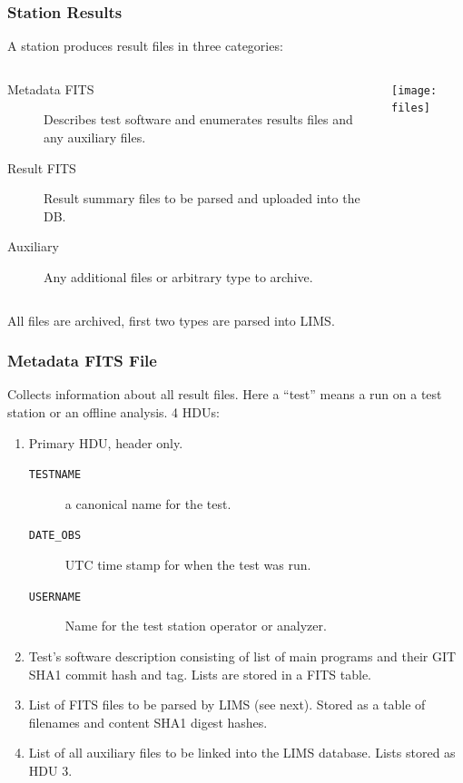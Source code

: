 \documentclass[xcolor=dvipsnames]{beamer}
\begin{document}
\begin{frame}
  \frametitle{Station Results}

  A station produces result files in three categories:

  \begin{columns}
    \begin{column}{0.5\paperwidth}
      \begin{description}
      \item[Metadata FITS] Describes test software and enumerates results
        files and any auxiliary files.
      \item[Result FITS] Result summary files to be parsed and uploaded
        into the DB.
      \item[Auxiliary] Any additional files or arbitrary type to archive.
      \end{description}
    \end{column}
    \begin{column}{0.45\paperwidth}
      \texttt{[image: files]}
    \end{column}
  \end{columns}
  All files are archived, first two types are parsed into LIMS.

\end{frame}

\begin{frame}
  \frametitle{Metadata FITS File} 

  Collects information about all result files.  Here a ``test'' means
  a run on a test station or an offline analysis.  4 HDUs:

  \begin{enumerate}
  \item Primary HDU, header only.
    \begin{description}
    \item[\texttt{TESTNAME}] a canonical name for the test.
    \item[\texttt{DATE\_OBS}] UTC time stamp for when the test was run.
    \item[\texttt{USERNAME}] Name for the test station operator or analyzer.
    \end{description}
  \item Test's software description consisting of list of main
    programs and their GIT SHA1 commit hash and tag.  Lists are stored
    in a FITS table.
  \item List of FITS files to be parsed by LIMS (see next).  Stored as
    a table of filenames and content SHA1 digest hashes.
  \item List of all auxiliary files to be linked into the LIMS
    database.  Lists stored as HDU 3.
  \end{enumerate}

\end{frame}
\end{document}
